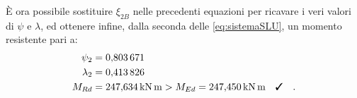 È ora possibile sostituire $\xi_{2B}$ nelle precedenti equazioni per ricavare i veri valori di $\psi$ e $\lambda$, ed ottenere infine, dalla seconda delle \ref{eq:sistemaSLU}, un momento resistente pari a:
\begin{equation}
  \begin{split}
    \psi_{2} &= \num{0.803671}\\
    \lambda_{2} &= \num{0.413826}\\
    M_{Rd} &= \SI{247.634}{\kilo\newton\metre} > M_{Ed} = \SI{247.450}{\kilo\newton\metre} \quad \checked \quad .
  \end{split}
\end{equation}

